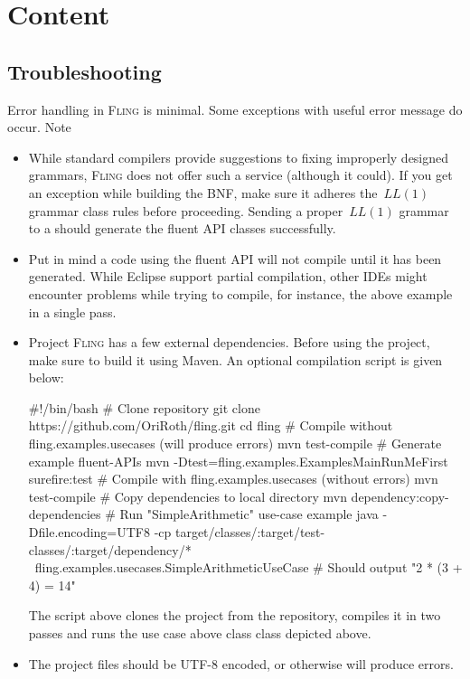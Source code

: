\documentclass[a4paper,UKenglish,cleveref, autoref]{darts-v2019}
\newcommand{\Fling}{F\textsc{ling}\xspace}
\providecommand\cc[1]{\textcolor{Sepia}{\text{\textup{\textbf{\texttt{#1}}}}}}
\newenvironment{content}{\section{Content}}{}
\begin{document}
\begin{content}
\subsection{Troubleshooting}
Error handling in \Fling is minimal. Some exceptions with useful error message
do occur.
Note
\begin{itemize}
	\item While standard compilers provide suggestions to fixing improperly designed
	grammars, \Fling does not offer such a service (although it could). If you get
	an exception while building the BNF, make sure it adheres the~$LL(1)$ grammar
	class rules before proceeding. Sending a proper~$LL(1)$ grammar to a \cc{JavaMediator}
	should generate the fluent API classes successfully.
	\item Put in mind a code using the fluent API will not compile until it has been
	generated. While Eclipse support partial compilation, other IDEs might encounter
	problems while trying to compile, for instance, the above example in a single pass.
	\item Project \Fling has a few external dependencies. Before using the project,
	make sure to build it using Maven. An optional compilation script is given below:
	\begin{excerpt*}
#!/bin/bash
# Clone repository
git clone https://github.com/OriRoth/fling.git
cd fling
# Compile without fling.examples.usecases (will produce errors)
mvn test-compile
# Generate example fluent-APIs
mvn -Dtest=fling.examples.ExamplesMainRunMeFirst surefire:test
# Compile with fling.examples.usecases (without errors)
mvn test-compile
# Copy dependencies to local directory
mvn dependency:copy-dependencies
# Run "SimpleArithmetic" use-case example
java -Dfile.encoding=UTF8 -cp target/classes/:target/test-classes/:target/dependency/* \
fling.examples.usecases.SimpleArithmeticUseCase
# Should output "2 * (3 + 4) = 14"
	\end{excerpt*}

The script above clones the project from the repository, compiles it in two
passes and runs the use case above class \cc{SimpleArithmeticUseCase} class
depicted above.
	\item The project files should be UTF-8 encoded, or otherwise will produce errors.
\end{itemize}


\end{content}
\end{document}
